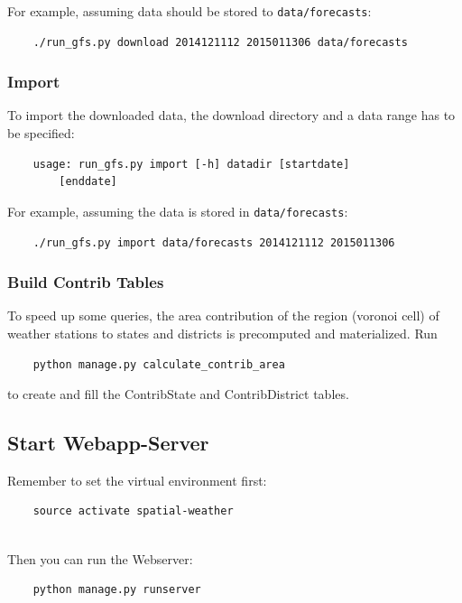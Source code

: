 \documentclass[paper=a4, fontsize=11pt]{article} %
\numberwithin{equation}{section} %
\numberwithin{figure}{section} %
\numberwithin{table}{section} %
\begin{document}
For example, assuming data should be stored to \texttt{data/forecasts}:
\begin{lstlisting}
	./run_gfs.py download 2014121112 2015011306 data/forecasts
\end{lstlisting}

\subsubsection*{Import}\label{import}

To import the downloaded data, the download directory and a data range
has to be specified:

\begin{lstlisting}
	usage: run_gfs.py import [-h] datadir [startdate]
		[enddate]
\end{lstlisting}


For example, assuming the data is stored in \texttt{data/forecasts}:

\begin{lstlisting}
	./run_gfs.py import data/forecasts 2014121112 2015011306
\end{lstlisting}


\subsubsection*{Build Contrib Tables}\label{build-contrib-tables}

To speed up some queries, the area contribution of the region (voronoi
cell) of weather stations to states and districts is precomputed and
materialized. Run

\begin{lstlisting}
	python manage.py calculate_contrib_area
\end{lstlisting}

to create and fill the ContribState and ContribDistrict tables.


\subsection{Start Webapp-Server}

Remember to set the virtual environment first:

\begin{lstlisting}
	source activate spatial-weather
\end{lstlisting}

\ \\
Then you can run the Webserver:
\begin{lstlisting}
	python manage.py runserver
\end{lstlisting}
\end{document}
